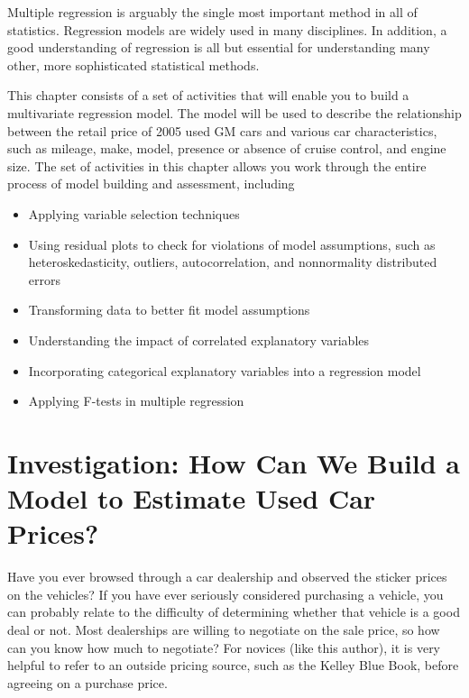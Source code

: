 \documentclass[
]{book}
\providecommand{\tightlist}{%
  \setlength{\itemsep}{0pt}\setlength{\parskip}{0pt}}
\begin{document}
Multiple regression is arguably the single most important method in all of statistics.
Regression models are widely used in many disciplines. In addition, a good understanding
of regression is all but essential for understanding many other, more sophisticated
statistical methods.

This chapter consists of a set of activities that will enable you to build a multivariate
regression model. The model will be used to describe the relationship between the retail price of 2005 used GM cars and various car characteristics, such as mileage, make, model, presence or absence of cruise control, and engine size. The set of activities in this chapter allows you work through the entire process of model building and assessment, including

\begin{itemize}
\tightlist
\item
  Applying variable selection techniques
\item
  Using residual plots to check for violations of model assumptions, such as heteroskedasticity, outliers, autocorrelation, and nonnormality distributed errors
\item
  Transforming data to better fit model assumptions
\item
  Understanding the impact of correlated explanatory variables
\item
  Incorporating categorical explanatory variables into a regression model
\item
  Applying F-tests in multiple regression
\end{itemize}

\newpage

\hypertarget{investigation-how-can-we-build-a-model-to-estimate-used-car-prices}{%
\section{Investigation: How Can We Build a Model to Estimate Used Car Prices?}\label{investigation-how-can-we-build-a-model-to-estimate-used-car-prices}}

Have you ever browsed through a car dealership and observed the sticker prices on the vehicles? If you have ever seriously considered purchasing a vehicle, you can probably relate to the difficulty of determining whether that vehicle is a good deal or not. Most dealerships are willing to negotiate on the sale price, so how can you know how much to negotiate? For novices (like this author), it is very helpful to refer to an outside
pricing source, such as the Kelley Blue Book, before agreeing on a purchase price.
\end{document}
